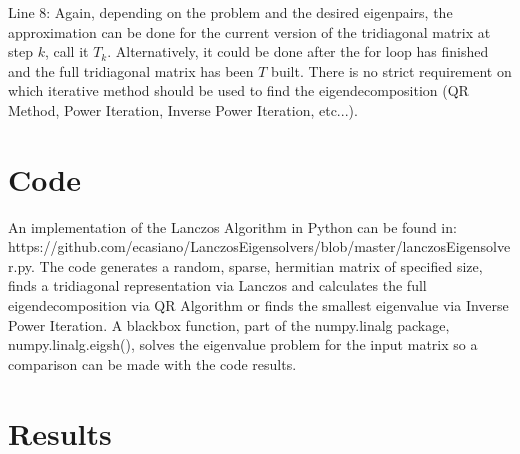 Line $8$: Again, depending on the problem and the desired eigenpairs, the approximation can be done for the current version of the tridiagonal matrix at step $k$, call it $T_k$. Alternatively, it could be done after the for loop has finished and the full tridiagonal matrix has been $T$ built. There is no strict requirement on which iterative method should be used to find the eigendecomposition (QR Method, Power Iteration, Inverse Power Iteration, etc...). 

\section{Code}

An implementation of the Lanczos Algorithm in Python can be found in: https://github.com/ecasiano/LanczosEigensolvers/blob/master/lanczosEigensolver.py. The code generates a random, sparse, hermitian matrix of specified size, finds a tridiagonal representation via Lanczos and calculates the full eigendecomposition via QR Algorithm or finds the smallest eigenvalue via Inverse Power Iteration. A blackbox function, part of the numpy.linalg package, numpy.linalg.eigsh(), solves the eigenvalue problem for the input matrix so a comparison can be made with the code results.

\section{Results}

